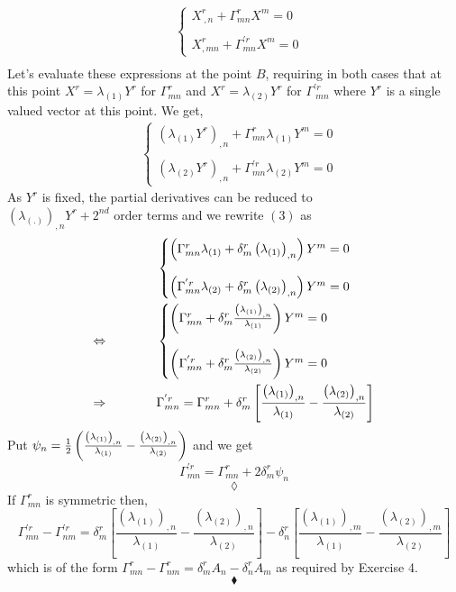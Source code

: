 \begin{align}
&\left\{\begin{matrix}
X^r_{\ ,n}+ \Gamma^r_{mn}X^m=0\\\\
X^{r}_{, mn}+ \Gamma^{'r}_{mn}X^m=0
\end{matrix}\right.\\
\end{align}
Let's evaluate these expressions at the point $B$, requiring in both cases that at this point $X^r=\lambda_{(1)} Y^r$ for $\Gamma^r_{mn}$ and $X^r=\lambda_{(2)} Y^r$ for $\Gamma^{'r}_{\ mn}$ where $Y^r$ is a single valued vector at this point. 
We get,
\begin{align}
&\left\{\begin{matrix}
\left(\lambda_{(1)} Y^r\right)_{, n}+ \Gamma^r_{mn}\lambda_{(1)} Y^m=0\\\\
\left(\lambda_{(2)}Y^r\right)_{, n}+ \Gamma^{'r}_{mn}\lambda_{(2)} Y^m=0
\end{matrix}\right.
\end{align}
As $Y^r$ is fixed, the partial derivatives can be reduced to $\left(\lambda_{(.)} \right)_{, n}Y^r + 2^{nd}\text{  order terms}$ and we rewrite $(3)$ as
\begin{align}
&\left\{\begin{matrix}
\left(\Gamma^r_{mn}\lambda_{(1)}+\delta^r_m\left(\lambda_{(1)}\right)_{, n}  \right) Y^m=0\\\\
\left(\Gamma^{'r}_{mn}\lambda_{(2)}+\delta^r_m\left(\lambda_{(2)}\right)_{, n}  \right) Y^m=0
\end{matrix}\right.\\
\Leftrightarrow \quad\quad\quad\quad &\left\{\begin{matrix}
\left(\Gamma^r_{mn}+\delta^r_m\frac{\left(\lambda_{(1)}\right)_{, n}}{\lambda_{(1)}}  \right) Y^m=0\\\\
\left(\Gamma^{'r}_{mn}+\delta^r_m\frac{\left(\lambda_{(2)}\right)_{, n}}{\lambda_{(2)}} \right) Y^m=0
\end{matrix}\right.\\
\Rightarrow \quad\quad\quad\quad &\Gamma^{'r}_{mn}= \Gamma^r_{mn}+\delta^r_m\left[\frac{\left(\lambda_{(1)}\right)_{, n}}{\lambda_{(1)}}-\frac{\left(\lambda_{(2)}\right)_{, n}}{\lambda_{(2)}}  \right]
\end{align}
Put $\psi_n = \frac{1}{2}\left(\frac{\left(\lambda_{(1)}\right)_{, n}}{\lambda_{(1)}}-\frac{\left(\lambda_{(2)}\right)_{, n}}{\lambda_{(2)}}\right) $
and we get $$\Gamma^{'r}_{mn}= \Gamma^r_{mn}+2\delta^r_m\psi_n  $$
$$\lozenge$$
If $\Gamma^r_{mn}$ is symmetric then,
$$\Gamma^{'r}_{mn}-\Gamma^{'r}_{nm}= \delta^r_m\left[\frac{\left(\lambda_{(1)}\right)_{, n}}{\lambda_{(1)}}-\frac{\left(\lambda_{(2)}\right)_{, n}}{\lambda_{(2)}}  \right]-\delta^r_n\left[\frac{\left(\lambda_{(1)}\right)_{, m}}{\lambda_{(1)}}-\frac{\left(\lambda_{(2)}\right)_{, m}}{\lambda_{(2)}}  \right] $$
which is of the form $\Gamma^r_{mn}-\Gamma^r_{nm} = \delta^r_mA_n - \delta^r_n A_m$ as required by Exercise 4. 
$$\blacklozenge$$
\newpage


